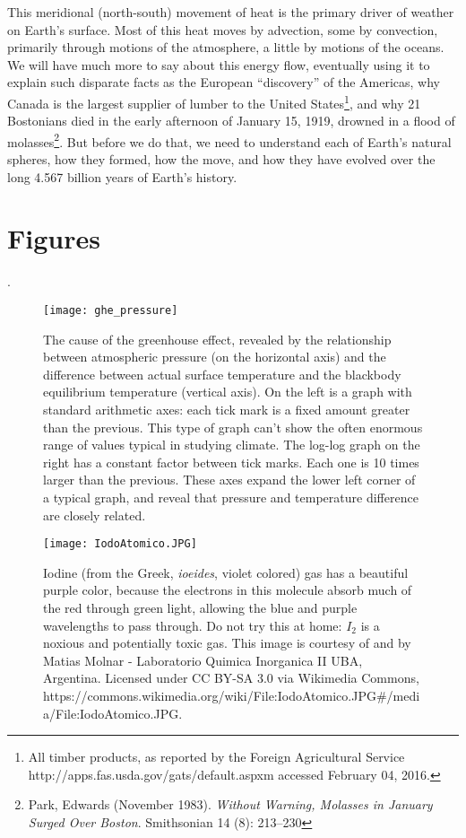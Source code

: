 \documentclass[amstex,12pt]{book}
\begin{document}
This meridional (north-south) movement of heat is the primary driver of weather on Earth's surface. Most of this heat moves by advection, some by convection, primarily through motions of the atmosphere, a little by motions of the oceans. We will have much more to say about this energy flow, eventually using it to explain such disparate facts as the European ``discovery'' of the Americas, why Canada is the largest supplier of lumber to the United States\footnote{All timber products, as reported by the Foreign Agricultural Service  http://apps.fas.usda.gov/gats/default.aspxm accessed February 04, 2016.}, and why 21 Bostonians died in the early afternoon of January 15, 1919, drowned in a flood of molasses\footnote{Park, Edwards (November 1983). \textit{Without Warning, Molasses in January Surged Over Boston}. Smithsonian 14 (8): 213–230}. But before we do that, we need to understand each of Earth's natural spheres, how they formed, how the move, and how they have evolved over the long 4.567 billion years of Earth's history. 

\section{Figures} \label{Figures}
.
\newpage

\begin{figure}[p]
\centering
\texttt{[image: ghe\_pressure]}%
\caption{The cause of the greenhouse effect, revealed by the relationship between atmospheric pressure (on the horizontal axis) and the difference between actual surface temperature and the blackbody equilibrium temperature (vertical axis). On the left is a graph with standard arithmetic axes: each tick mark is a fixed amount greater than the previous. This type of graph can't show the often enormous range of values typical in studying climate. The log-log graph on the right has a constant factor between tick marks. Each one is 10 times larger than the previous. These axes expand the lower left corner of a typical graph, and reveal that pressure and temperature difference are closely related. }   
\label{fig:tghe_P}
\end{figure}

\begin{figure}[p]
\centering
\texttt{[image: IodoAtomico.JPG]}
\caption{Iodine (from the Greek, \textit{ioeides}, violet colored) gas has a beautiful purple color, because the electrons in this molecule absorb much of the red through green light, allowing the blue and purple wavelengths to pass through. Do not try this at home: $I_2$ is a noxious and potentially toxic gas. This image is courtesy of and by Matias Molnar - Laboratorio Quimica Inorganica II UBA, Argentina. Licensed under CC BY-SA 3.0 via Wikimedia Commons,  https://commons.wikimedia.org/wiki/File:IodoAtomico.JPG\#/media/File:IodoAtomico.JPG.}   
\label{fig:iodine}
\end{figure}
\end{document}
